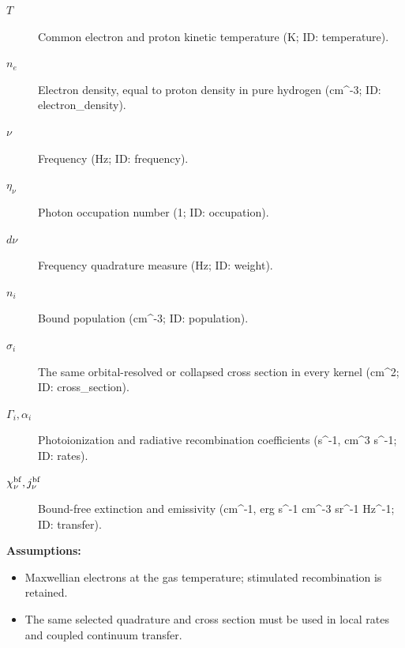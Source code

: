 \begin{description}
\item[$T$] Common electron and proton kinetic temperature (K; ID: temperature).
\item[$n_e$] Electron density, equal to proton density in pure hydrogen (cm\textasciicircum{}-3; ID: electron\_density).
\item[$\nu$] Frequency (Hz; ID: frequency).
\item[$\eta_\nu$] Photon occupation number (1; ID: occupation).
\item[$d\nu$] Frequency quadrature measure (Hz; ID: weight).
\item[$n_i$] Bound population (cm\textasciicircum{}-3; ID: population).
\item[$\sigma_i$] The same orbital-resolved or collapsed cross section in every kernel (cm\textasciicircum{}2; ID: cross\_section).
\item[$\Gamma_i,\alpha_i$] Photoionization and radiative recombination coefficients (s\textasciicircum{}-1, cm\textasciicircum{}3 s\textasciicircum{}-1; ID: rates).
\item[$\chi_\nu^{\rm bf},j_\nu^{\rm bf}$] Bound-free extinction and emissivity (cm\textasciicircum{}-1, erg s\textasciicircum{}-1 cm\textasciicircum{}-3 sr\textasciicircum{}-1 Hz\textasciicircum{}-1; ID: transfer).
\end{description}

\noindent\textbf{Assumptions:}
\begin{itemize}
\item Maxwellian electrons at the gas temperature; stimulated recombination is retained.
\item The same selected quadrature and cross section must be used in local rates and coupled continuum transfer.
\end{itemize}
